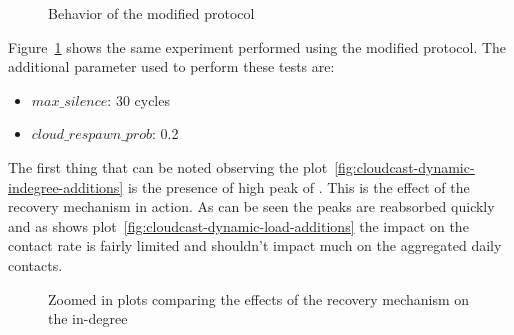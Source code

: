 \begin{figure}[h!]
  \centering
  \caption{Behavior of the modified \peersampling protocol}
  \label{fig:cloudcast-dynamic-additions}
\end{figure}


Figure~\ref{fig:cloudcast-dynamic-additions} shows the same experiment
performed using the modified \cloudcast protocol. The additional
parameter used to perform these tests are:
\begin{itemize}
  \item $max\_silence$: 30 cycles
  \item $cloud\_respawn\_prob$: 0.2
\end{itemize}

The first thing that can be noted observing the
plot~\ref{fig:cloudcast-dynamic-indegree-additions} is the presence of
high peak of \cloud \descriptors. This is the effect of the recovery
mechanism in action. As can be seen the peaks are reabsorbed quickly
and as shows plot~\ref{fig:cloudcast-dynamic-load-additions} the
impact on the \cloud contact rate is fairly limited and shouldn't
impact much on the aggregated daily contacts.

\begin{figure}[h!]
  \centering
  \caption{Zoomed in plots comparing the effects of the recovery
    mechanism on the \cloud in-degree}
  \label{fig:cloudcast-dynamic-indegree-additions-detail}
\end{figure}


